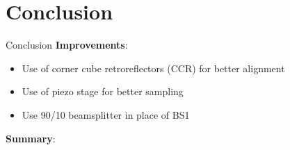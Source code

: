 \documentclass[11pt]{beamer}
\begin{document}
\section{Conclusion}
\begin{frame}{Conclusion}
\textbf{Improvements}:\\
	\begin{itemize}
		\item Use of corner cube retroreflectors (CCR) for better alignment
		\item Use of piezo stage for better sampling
		\item Use 90/10 beamsplitter in place of BS1
	\end{itemize}
	
	\vspace{5pt}
\textbf{Summary}:\\
	
\end{frame}
\end{document}
